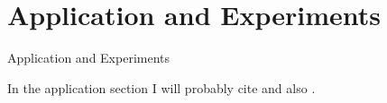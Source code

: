 \section{Application and Experiments}
  \begin{frame}{Application and Experiments}

    In the application section I will probably cite \cite{kernel_estimation_1} and also \cite{kernel_estimation_2}.

  \end{frame}